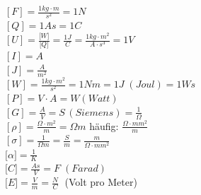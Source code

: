 \begin{minipage}{5cm}
	$\left[F\right] = \frac{1kg \cdot m}{s^2} = 1N$ \\
	$\left[Q\right] = 1 As = 1 C$ \\
	$\left[U\right] = \frac{\lbrack W \rbrack}{\lbrack Q \rbrack} =\frac{1 J}{C} = \frac{1kg \cdot m^2}{A \cdot s^3} = 1 V$ \\
	$\left[I\right] = A $ \\
	$\left[J\right] = \frac {A}{m^2} $\\
	$\left[W\right] = \frac{1kg \cdot m^2}{s^2} = 1Nm = 1 J \; (Joul) = 1 Ws$ \\
	$ \left[P\right] = V \cdot A = W (Watt)$\\
	$\left[G\right] = \frac{A}{V} = S \, (Siemens) = \frac{1}{\Omega}$\\
	$\left[ \rho \right] = \frac{\Omega \cdot m^2}{m} = \Omega m$  häufig:  $\frac{\Omega \cdot mm^2}{m} $\\
	$\left[ \sigma \right] = \frac{1}{\Omega m} = \frac{S}{m} = \frac{m}{\Omega \cdot mm^2} $\\
	$\lbrack \alpha \rbrack = \frac{1}{K}$\\
	$\lbrack C \rbrack = \frac{As}{V} = F \; (Farad)$ \\ 
	$\lbrack E \rbrack = \frac{V}{m} = \frac{N}{C} \; $ (Volt pro Meter) \\ 
\end{minipage}

